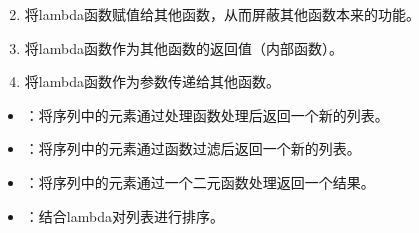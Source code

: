 \documentclass[letterpaper,10pt,english]{sphinxmanual}
\begin{document}
%
\begin{sphinxVerbatim}[commandchars=\\\{\},numbers=left,firstnumber=1,stepnumber=1]
     
 
\end{sphinxVerbatim}
\begin{enumerate}
\setcounter{enumi}{1}
\item {} 
将lambda函数赋值给其他函数，从而屏蔽其他函数本来的功能。

\item {} 
将lambda函数作为其他函数的返回值（内部函数）。

\item {} 
将lambda函数作为参数传递给其他函数。

\end{enumerate}
\begin{itemize}
\item {} 
 ：将序列中的元素通过处理函数处理后返回一个新的列表。

\item {} 
 ：将序列中的元素通过函数过滤后返回一个新的列表。

\item {} 
 ：将序列中的元素通过一个二元函数处理返回一个结果。

\item {} 
 ：结合lambda对列表进行排序。 

\end{itemize}
\end{document}
